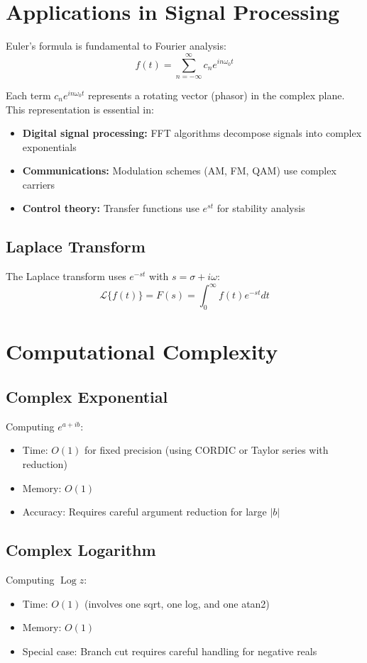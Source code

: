 \section{Applications in Signal Processing}

Euler's formula is fundamental to Fourier analysis:
\[
f(t) = \sum_{n=-\infty}^{\infty} c_n e^{in\omega_0 t}
\]

Each term $c_n e^{in\omega_0 t}$ represents a rotating vector (phasor) in the complex plane.
This representation is essential in:
\begin{itemize}
\item \textbf{Digital signal processing:} FFT algorithms decompose signals into complex exponentials
\item \textbf{Communications:} Modulation schemes (AM, FM, QAM) use complex carriers
\item \textbf{Control theory:} Transfer functions use $e^{st}$ for stability analysis
\end{itemize}

\subsection{Laplace Transform}

The Laplace transform uses $e^{-st}$ with $s = \sigma + i\omega$:
\[
\mathcal{L}\{f(t)\} = F(s) = \int_0^{\infty} f(t) e^{-st} dt
\]

\section{Computational Complexity}

\subsection{Complex Exponential}
Computing $e^{a+ib}$:
\begin{itemize}
\item Time: $O(1)$ for fixed precision (using CORDIC or Taylor series with reduction)
\item Memory: $O(1)$
\item Accuracy: Requires careful argument reduction for large $|b|$
\end{itemize}

\subsection{Complex Logarithm}
Computing $\operatorname{Log} z$:
\begin{itemize}
\item Time: $O(1)$ (involves one sqrt, one log, and one atan2)
\item Memory: $O(1)$
\item Special case: Branch cut requires careful handling for negative reals
\end{itemize}

